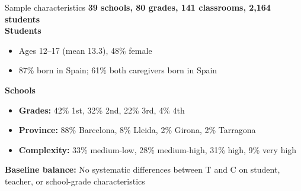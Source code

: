 \documentclass[xcolor=usenames,dvipsnames]{beamer}
\begin{document}
\begin{frame}{Sample characteristics}\label{slide:sample}
\small
\textbf{39 schools, 80 grades, 141 classrooms, 2,164 students} \\
\vspace{0.3cm}
\textcolor{HopBlue}{\textbf{Students}}
\begin{itemize}
\item Ages 12--17 (mean 13.3), 48\% female
\item 87\% born in Spain; 61\% both caregivers born in Spain
\end{itemize}
\vspace{0.1cm}
\textcolor{HopBlue}{\textbf{Schools}}
\begin{itemize}
\item \textbf{Grades:} 42\% 1st, 32\% 2nd, 22\% 3rd, 4\% 4th
\item \textbf{Province:} 88\% Barcelona, 8\% Lleida, 2\% Girona, 2\% Tarragona
\item \textbf{Complexity:} 33\% medium-low, 28\% medium-high, 31\% high, 9\% very high
\end{itemize}
\vspace{0.1cm}
\textcolor{HopBlue}{\textbf{Baseline balance:}} No systematic differences between T and C on student, teacher, or school-grade characteristics
\vspace{0.1cm}
\hyperlink{balance}{} \hyperlink{descriptives}{} \hyperlink{slide:attrition}{}
\end{frame}
\end{document}
